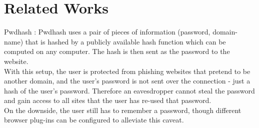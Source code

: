 \documentclass[11pt]{article}
\begin{document}
\section{Related Works}
Pwdhash \cite{pwdhash}:
Pwdhash uses a pair of pieces of information (password, domain-name) that is hashed by a publicly available hash function which can be computed on any computer. The hash is then sent as the password to the website.\\
	With this setup, the user is protected from phishing websites that pretend to be another domain, and the user’s password is not sent over the connection - just a hash of the user's password. Therefore an eavesdropper cannot steal the password and gain access to all sites that the user has re-used that password.\\
	On the downside, the user still has to remember a password, though different browser plug-ins can be configured to alleviate this caveat.
\end{document}
